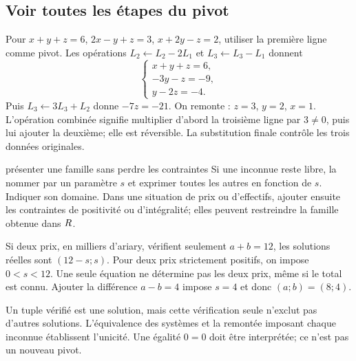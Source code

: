 \subsection*{Voir toutes les étapes du pivot}
\begin{exemple}
Pour $x+y+z=6$, $2x-y+z=3$, $x+2y-z=2$, utiliser la première ligne comme pivot. Les opérations $L_2\leftarrow L_2-2L_1$ et $L_3\leftarrow L_3-L_1$ donnent
\[
\begin{cases}x+y+z=6,\\-3y-z=-9,\\y-2z=-4.\end{cases}
\]
Puis $L_3\leftarrow3L_3+L_2$ donne $-7z=-21$. On remonte : $z=3$, $y=2$, $x=1$. L’opération combinée signifie multiplier d’abord la troisième ligne par $3\ne0$, puis lui ajouter la deuxième; elle est réversible. La substitution finale contrôle les trois données originales.
\end{exemple}
\begin{methode}{présenter une famille sans perdre les contraintes}
Si une inconnue reste libre, la nommer par un paramètre $s$ et exprimer toutes les autres en fonction de $s$. Indiquer son domaine. Dans une situation de prix ou d’effectifs, ajouter ensuite les contraintes de positivité ou d’intégralité; elles peuvent restreindre la famille obtenue dans $R$.
\end{methode}
\begin{exemple}
Si deux prix, en milliers d’ariary, vérifient seulement $a+b=12$, les solutions réelles sont $(12-s;s)$. Pour deux prix strictement positifs, on impose $0<s<12$. Une seule équation ne détermine pas les deux prix, même si le total est connu. Ajouter la différence $a-b=4$ impose $s=4$ et donc $(a;b)=(8;4)$.
\end{exemple}
\begin{remarque}
Un tuple vérifié est une solution, mais cette vérification seule n’exclut pas d’autres solutions. L’équivalence des systèmes et la remontée imposant chaque inconnue établissent l’unicité. Une égalité $0=0$ doit être interprétée; ce n’est pas un nouveau pivot.
\end{remarque}

